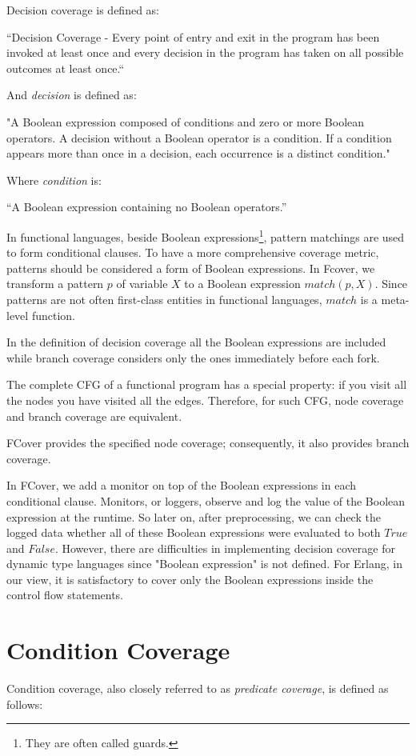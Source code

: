 \documentclass[12pt,a4paper]{report}
\begin{document}
Decision coverage is defined as:

“Decision Coverage - Every point of entry and exit in the program has been invoked at least once and every decision in the program has taken on all possible outcomes at least once.“\cite{cast-10}

And \emph{decision} is defined as:

"A Boolean expression composed of conditions and zero or more Boolean operators. A decision without a Boolean operator is a condition. If a condition appears more than once in a decision, each occurrence is a distinct condition."\cite{cast-10}

Where \emph{condition} is:

“A Boolean expression containing no Boolean operators.”\cite{cast-10}

In functional languages, beside Boolean expressions\footnote{They are often called guards.}, pattern matchings are used to form conditional clauses. To have a more comprehensive coverage metric, patterns should be considered a form of Boolean expressions. In Fcover, we transform a pattern $p$ of variable $X$ to a Boolean expression $match(p,X)$. Since patterns are not often first-class entities in functional languages, $match$ is a meta-level function.

In the definition of decision coverage all the Boolean expressions are included while branch coverage considers only the ones immediately before each fork.

The complete CFG of a functional program has a special property: if you visit all the nodes you have visited all the edges. Therefore, for such CFG, node coverage and branch coverage are equivalent. 

FCover provides the specified node coverage; consequently, it also provides branch coverage.

In FCover, we add a monitor on top of the Boolean expressions in each conditional clause. Monitors, or loggers, observe and log the value of the Boolean expression at the runtime. So later on, after preprocessing, we can check the logged data whether all of these Boolean expressions were evaluated to both $True$ and $False$. However, there are difficulties in implementing decision coverage for dynamic type languages since "Boolean expression" is not defined. For Erlang, in our view, it is satisfactory to cover only the Boolean expressions inside the control flow statements.

 
\section{Condition Coverage}
Condition coverage, also closely referred to as \emph{predicate coverage}, is defined as follows:
\end{document}
